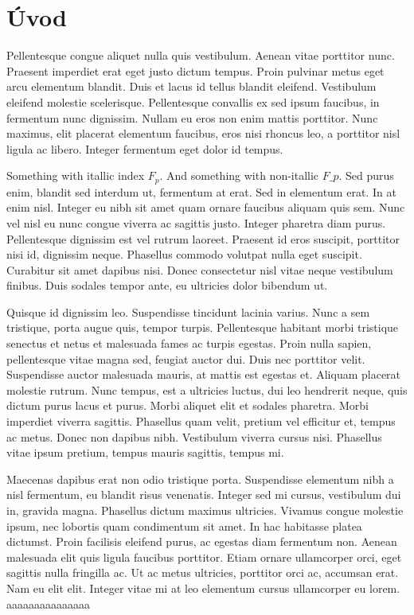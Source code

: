 \chapter*{Úvod}

Pellentesque congue aliquet nulla quis vestibulum. Aenean vitae porttitor nunc. Praesent imperdiet erat eget justo dictum tempus. Proin pulvinar metus eget arcu elementum blandit. Duis et lacus id tellus blandit eleifend. Vestibulum eleifend molestie scelerisque. Pellentesque convallis ex sed ipsum faucibus, in fermentum nunc dignissim. Nullam eu eros non enim mattis porttitor. Nunc maximus, elit placerat elementum faucibus, eros nisi rhoncus leo, a porttitor nisl ligula ac libero. Integer fermentum eget dolor id tempus.

Something with itallic index $F_p$. And something with non-itallic $F\_p$. Sed purus enim, blandit sed interdum ut, fermentum at erat. Sed in elementum erat. In at enim nisl. Integer eu nibh sit amet quam ornare faucibus aliquam quis sem. Nunc vel nisl eu nunc congue viverra ac sagittis justo. Integer pharetra diam purus. Pellentesque dignissim est vel rutrum laoreet. Praesent id eros suscipit, porttitor nisi id, dignissim neque. Phasellus commodo volutpat nulla eget suscipit. Curabitur sit amet dapibus nisi. Donec consectetur nisl vitae neque vestibulum finibus. Duis sodales tempor ante, eu ultricies dolor bibendum ut.

Quisque id dignissim leo. Suspendisse tincidunt lacinia varius. Nunc a sem tristique, porta augue quis, tempor turpis. Pellentesque habitant morbi tristique senectus et netus et malesuada fames ac turpis egestas. Proin nulla sapien, pellentesque vitae magna sed, feugiat auctor dui. Duis nec porttitor velit. Suspendisse auctor malesuada mauris, at mattis est egestas et. Aliquam placerat molestie rutrum. Nunc tempus, est a ultricies luctus, dui leo hendrerit neque, quis dictum purus lacus et purus. Morbi aliquet elit et sodales pharetra. Morbi imperdiet viverra sagittis. Phasellus quam velit, pretium vel efficitur et, tempus ac metus. Donec non dapibus nibh. Vestibulum viverra cursus nisi. Phasellus vitae ipsum pretium, tempus mauris sagittis, tempus mi.

Maecenas dapibus erat non odio tristique porta. Suspendisse elementum nibh a nisl fermentum, eu blandit risus venenatis. Integer sed mi cursus, vestibulum dui in, gravida magna. Phasellus dictum maximus ultricies. Vivamus congue molestie ipsum, nec lobortis quam condimentum sit amet. In hac habitasse platea dictumst. Proin facilisis eleifend purus, ac egestas diam fermentum non. Aenean malesuada elit quis ligula faucibus porttitor. Etiam ornare ullamcorper orci, eget sagittis nulla fringilla ac. Ut ac metus ultricies, porttitor orci ac, accumsan erat. Nam eu elit elit. Integer vitae mi at leo elementum cursus ullamcorper eu lorem. aaaaaaaaaaaaaaa

